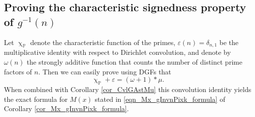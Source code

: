 \documentclass[11pt,reqno,a4letter]{article}
\numberwithin{figure}{section}
\numberwithin{table}{section}
\renewcommand{\chi}{\upchi}
\theoremstyle{plain}
\numberwithin{theorem}{section}
\theoremstyle{definition}
\begin{document}
\subsection{Proving the characteristic signedness property of $g^{-1}(n)$} 

Let $\chi_{\mathbb{P}}$ denote the characteristic function of the primes, 
$\varepsilon(n) = \delta_{n,1}$ be the multiplicative identity with respect to Dirichlet convolution, 
and denote by $\omega(n)$ the strongly additive function that counts the number of 
distinct prime factors of $n$. Then we can easily prove using DGFs that 
\begin{equation}
\label{eqn_AntiqueDivisorSumIdent} 
\chi_{\mathbb{P}} + \varepsilon = (\omega + 1) \ast \mu. 
\end{equation} 
When combined with Corollary \ref{cor_CvlGAstMu} 
this convolution identity yields the exact 
formula for $M(x)$ stated in \eqref{eqn_Mx_gInvnPixk_formula} of 
Corollary \ref{cor_Mx_gInvnPixk_formula}. 
\end{document}
